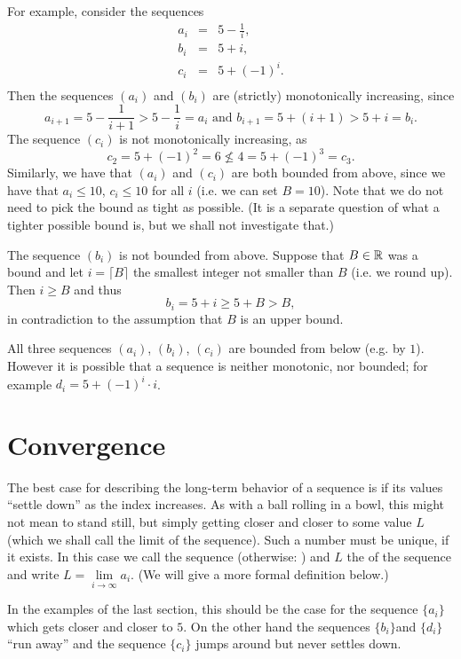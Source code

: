 For example, consider the sequences
\begin{eqnarray*}
a_i&=&5-\frac{1}{i},\\
b_i&=&5+i,\\
c_i&=&5+(-1)^i.\\
\end{eqnarray*}
Then the sequences $(a_i)$ and $(b_i)$ are (strictly) monotonically increasing, since
\[
a_{i+1}=5-\frac{1}{i+1}> 5-\frac{1}{i}=a_i
\mbox{\ and \ }
b_{i+1}=5+(i+1)> 5+i=b_i.
\]
The sequence $(c_i)$ is not monotonically increasing, as 
\[
c_2=5+(-1)^2=6\not\le 4=5+(-1)^3=c_3.
\]Similarly, we have that $(a_i)$ and $(c_i)$ are both bounded from above, since we have
that $a_i\le 10$, $c_i\le 10$ for all $i$ (i.e. we can set $B=10$).
Note that we do not need to pick the bound as tight as possible. (It is a separate
question of what a tighter possible bound is, but we shall not investigate that.)

The sequence $(b_i)$ is not bounded from above. Suppose that $B\in{\mathbb R}$ was a bound and
let $i=\lceil B\rceil$ the smallest integer not smaller than $B$ (i.e. we round up).
Then $i\ge B$ and thus
\[
b_i=5+i\ge5+B>B,
\]
in contradiction to the assumption that $B$ is an upper bound.

All three sequences $(a_i)$, $(b_i)$, $(c_i)$ are bounded from below (e.g. by $1$).
However it is possible that a sequence is neither monotonic, nor bounded; for example 
$d_i=5+(-1)^i\cdot i$.

\section{Convergence}
\label{seclimits}

The best case for describing the long-term behavior of a sequence is if
its values ``settle down'' as the index increases. As with a ball rolling in a bowl, this
might not mean to stand still, but simply getting
closer and closer to some value $L$ (which we shall call the limit of the sequence).
Such a number must be unique, if it exists.
In this case we call the sequence  (otherwise:
)
and $L$ the  of the
sequence and write $L=\lim\limits_{i\to\infty}a_i$. (We will give a more formal
definition below.)

In the examples of the last section, this should be the case for the sequence
$\{a_i\}$ which gets closer and closer to $5$. On the other hand the
sequences $\{b_i\} $and $\{d_i\} $ ``run away'' and the sequence $\{c_i\}$
jumps around but never settles down.


